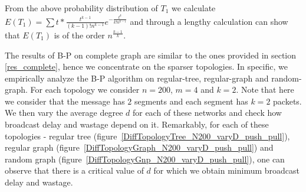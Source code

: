 From the above probability distribution of $T_{1}$ we calculate $E(T_{1})=\sum t*\frac{t^{k-1}}{\left( k-1\right) !n^{k-1}}e^{-\frac{t^{k}}{k!n^{k-1}}}$
and through a lengthy calculation can show that $E(T_{1})$ is of the order $n^{\frac{k-1}{k}}$.
 
 \vspace{-2mm}
 \fi
The results of B-P on complete graph are similar to the ones provided in section \ref{res_complete}, hence we concentrate on the sparser topologies. 
In specific, we empirically analyze the B-P algorithm on regular-tree, regular-graph and random-graph. For each topology we consider $n=200$, $m = 4$ and $k=2$.
Note that here we consider that the message has $2$ segments and each segment has $k=2$ packets. 
We then vary the average degree $d$ for each of these networks and check how broadcast delay and wastage depend on it. Remarkably, for each of these topologies 
- regular tree (figure~\ref{DiffTopologyTree_N200_varyD_push_pull}), regular graph (figure~\ref{DiffTopologyGraph_N200_varyD_push_pull}) and random graph 
(figure~\ref{DiffTopologyGnp_N200_varyD_push_pull}), one can observe that there is a critical value of $d$ for which we obtain minimum broadcast delay and 
wastage.
% 
